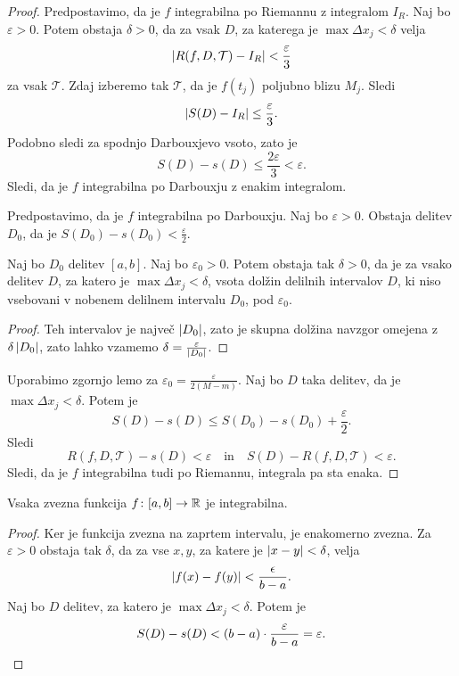 \documentclass[12pt, a4paper]{article}
\begin{document}
\begin{proof}
Predpostavimo, da je $f$ integrabilna po Riemannu z integralom $I_R$. Naj bo $\varepsilon>0$. Potem obstaja $\delta>0$, da za vsak $D$, za katerega je $\max\Delta x_j<\delta$ velja
\[
\left\lvert R(f,D,\mathcal{T})-I_R\right\rvert<\frac{\varepsilon}{3}
\]
za vsak $\mathcal{T}$. Zdaj izberemo tak $\mathcal{T}$, da je $f(t_j)$ poljubno blizu $M_j$. Sledi
\[
\left\lvert S(D)-I_R\right\rvert\leq\frac{\varepsilon}{3}.
\]
Podobno sledi za spodnjo Darbouxjevo vsoto, zato je
\[
S(D)-s(D)\leq\frac{2\varepsilon}{3}<\varepsilon.
\]
Sledi, da je $f$ integrabilna po Darbouxju z enakim integralom.

Predpostavimo, da je $f$ integrabilna po Darbouxju. Naj bo $\varepsilon>0$. Obstaja delitev $D_0$, da je $S(D_0)-s(D_0)<\frac{\varepsilon}{2}$.

\begin{lema*}
Naj bo $D_0$ delitev $[a,b]$. Naj bo $\varepsilon_0>0$. Potem obstaja tak $\delta>0$, da je za vsako delitev $D$, za katero je $\max\Delta x_j<\delta$, vsota dolžin delilnih intervalov $D$, ki niso vsebovani v nobenem delilnem intervalu $D_0$, pod $\varepsilon_0$.
\end{lema*}

\begin{proof}
Teh intervalov je največ $\left\lvert D_0\right\rvert$, zato je skupna dolžina navzgor omejena z $\delta\left\lvert D_0\right\rvert$, zato lahko vzamemo $\delta=\frac{\varepsilon}{\left\lvert D_0\right\rvert}$.
\end{proof}

Uporabimo zgornjo lemo za $\varepsilon_0=\frac{\varepsilon}{2(M-m)}$. Naj bo $D$ taka delitev, da je $\max\Delta x_j<\delta$. Potem je
\[
S(D)-s(D)\leq S(D_0)-s(D_0) + \frac{\varepsilon}{2}.
\]
Sledi
\[
R(f,D,\mathcal{T})-s(D)<\varepsilon\quad\text{in}\quad S(D)-R(f,D,\mathcal{T})<\varepsilon.
\]
Sledi, da je $f$ integrabilna tudi po Riemannu, integrala pa sta enaka.
\end{proof}

\begin{izrek}
Vsaka zvezna funkcija $f\colon[a,b]\to\mathbb{R}$ je integrabilna.
\end{izrek}

\begin{proof}
Ker je funkcija zvezna na zaprtem intervalu, je enakomerno zvezna. Za $\varepsilon>0$ obstaja tak $\delta$, da za vse $x,y$, za katere je $\left\lvert x-y\right\rvert<\delta$, velja
\[
\left\lvert f(x)-f(y)\right\rvert<\frac{\epsilon}{b-a}.
\]
Naj bo $D$ delitev, za katero je $\max\Delta x_j<\delta$. Potem je
\[
S(D)-s(D)<(b-a)\cdot\frac{\varepsilon}{b-a}=\varepsilon.\qedhere
\]
\end{proof}
\end{document}
